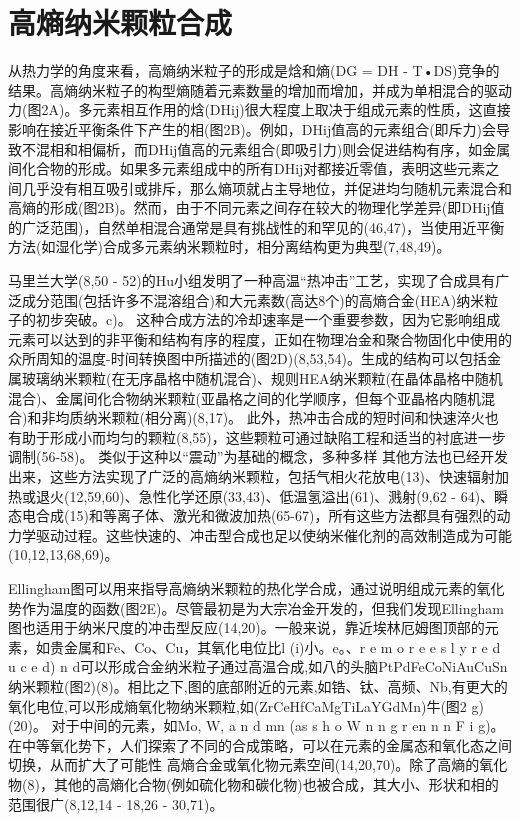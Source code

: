 \documentclass[a4paper]{article}
\begin{document}
\section*{高熵纳米颗粒合成}

从热力学的角度来看，高熵纳米粒子的形成是焓和熵(DG = DH - T•DS)竞争的结果。高熵纳米粒子的构型熵随着元素数量的增加而增加，并成为单相混合的驱动力(图2A)。多元素相互作用的焓(DHij)很大程度上取决于组成元素的性质，这直接影响在接近平衡条件下产生的相(图2B)。例如，DHij值高的元素组合(即斥力)会导致不混相和相偏析，而DHij值高的元素组合(即吸引力)则会促进结构有序，如金属间化合物的形成。如果多元素组成中的所有DHij对都接近零值，表明这些元素之间几乎没有相互吸引或排斥，那么熵项就占主导地位，并促进均匀随机元素混合和高熵的形成(图2B)。然而，由于不同元素之间存在较大的物理化学差异(即DHij值的广泛范围)，自然单相混合通常是具有挑战性的和罕见的(46,47)，当使用近平衡方法(如湿化学)合成多元素纳米颗粒时，相分离结构更为典型(7,48,49)。


马里兰大学(8,50 - 52)的Hu小组发明了一种高温“热冲击”工艺，实现了合成具有广泛成分范围(包括许多不混溶组合)和大元素数(高达8个)的高熵合金(HEA)纳米粒子的初步突破。c)。
这种合成方法的冷却速率是一个重要参数，因为它影响组成元素可以达到的非平衡和结构有序的程度，正如在物理冶金和聚合物固化中使用的众所周知的温度-时间转换图中所描述的(图2D)(8,53,54)。生成的结构可以包括金属玻璃纳米颗粒(在无序晶格中随机混合)、规则HEA纳米颗粒(在晶体晶格中随机混合)、金属间化合物纳米颗粒(亚晶格之间的化学顺序，但每个亚晶格内随机混合)和非均质纳米颗粒(相分离)(8,17)。
此外，热冲击合成的短时间和快速淬火也有助于形成小而均匀的颗粒(8,55)，这些颗粒可通过缺陷工程和适当的衬底进一步调制(56-58)。
类似于这种以“震动”为基础的概念，多种多样
其他方法也已经开发出来，这些方法实现了广泛的高熵纳米颗粒，包括气相火花放电(13)、快速辐射加热或退火(12,59,60)、急性化学还原(33,43)、低温氢溢出(61)、溅射(9,62 - 64)、瞬态电合成(15)和等离子体、激光和微波加热(65-67)，所有这些方法都具有强烈的动力学驱动过程。这些快速的、冲击型合成也足以使纳米催化剂的高效制造成为可能(10,12,13,68,69)。



Ellingham图可以用来指导高熵纳米颗粒的热化学合成，通过说明组成元素的氧化势作为温度的函数(图2E)。尽管最初是为大宗冶金开发的，但我们发现Ellingham图也适用于纳米尺度的冲击型反应(14,20)。一般来说，靠近埃林厄姆图顶部的元素，如贵金属和Fe、Co、Cu，其氧化电位比l (i)小。e。、r e m o r e e s l y r e d u c e d) n d可以形成合金纳米粒子通过高温合成,如八的头脑PtPdFeCoNiAuCuSn纳米颗粒(图2)(8)。相比之下,图的底部附近的元素,如锆、钛、高频、Nb,有更大的氧化电位,可以形成熵氧化物纳米颗粒,如(ZrCeHfCaMgTiLaYGdMn)牛(图2 g)(20)。
对于中间的元素，如Mo, W, a n d mn (as s h o W n n g r en n n F i g)。在中等氧化势下，人们探索了不同的合成策略，可以在元素的金属态和氧化态之间切换，从而扩大了可能性
高熵合金或氧化物元素空间(14,20,70)。除了高熵的氧化物(8)，其他的高熵化合物(例如硫化物和碳化物)也被合成，其大小、形状和相的范围很广(8,12,14 - 18,26 - 30,71)。
\end{document}
